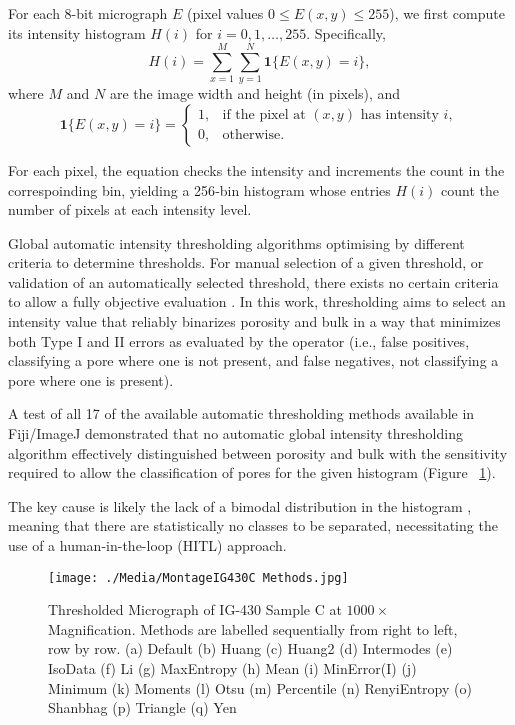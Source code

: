 \documentclass[3p,twocolumn]{elsarticle}
\begin{document}
For each 8-bit micrograph \(E\) (pixel values \(0 \le E(x,y) \le 255\)), we
first compute its intensity histogram \(H(i)\) for \(i=0,1,\dots,255\).
Specifically,
\[
H(i) = \sum_{x=1}^{M}\sum_{y=1}^{N} \mathbf{1}\{E(x,y)=i\},
\]
where \(M\) and \(N\) are the image width and height (in pixels), and
\[
\mathbf{1}\{E(x,y)=i\} =
\begin{cases}
1, & \text{if the pixel at }(x,y)\text{ has intensity }i,\\
0, & \text{otherwise.}
\end{cases}
\]

For each pixel, the equation checks the intensity and increments
the count in the correspoinding bin, yielding a 256‐bin histogram whose entries
\(H(i)\) count the number of pixels at each intensity level. 

	Global automatic intensity thresholding algorithms optimising by different
	criteria to determine thresholds. For manual selection of a given threshold,
	or validation of an automatically selected threshold, there exists no certain
	criteria to allow a fully objective evaluation \citep{Huang2019}. In this
	work, thresholding aims to select an intensity value that reliably binarizes
	porosity and bulk in a way that minimizes both Type I and II errors as
	evaluated by the operator (i.e., false positives, classifying a pore where one
	is not present, and false negatives, not classifying a pore where one is
	present).

  A test of all 17 of the available automatic thresholding methods available in
   Fiji/ImageJ demonstrated that no automatic global intensity thresholding
   algorithm effectively distinguished between porosity and bulk with the
   sensitivity required to allow the classification of pores for the given
   histogram (Figure ~\ref{fig:Try All Thresholding Methods}).

   The key cause is likely the lack of a bimodal distribution in the histogram
  , meaning that there
  are statistically no classes to be separated, necessitating the use of a
  human-in-the-loop (HITL) approach.

	\begin{figure}[!htbp]
		\centering
		\texttt{[image: ./Media/MontageIG430C Methods.jpg]}
		\caption{Thresholded Micrograph of IG-430 Sample C at $1000\times$ Magnification. Methods are labelled sequentially from right to left, row by row. (a) Default
			(b) Huang
			(c) Huang2
			(d) Intermodes
			(e) IsoData
			(f) Li
			(g) MaxEntropy
			(h) Mean
			(i) MinError(I)
			(j) Minimum
			(k) Moments
			(l) Otsu
			(m) Percentile
			(n) RenyiEntropy
			(o) Shanbhag
			(p) Triangle
			(q) Yen}
		\label{fig:Try All Thresholding Methods}
	\end{figure}  
\end{document}

